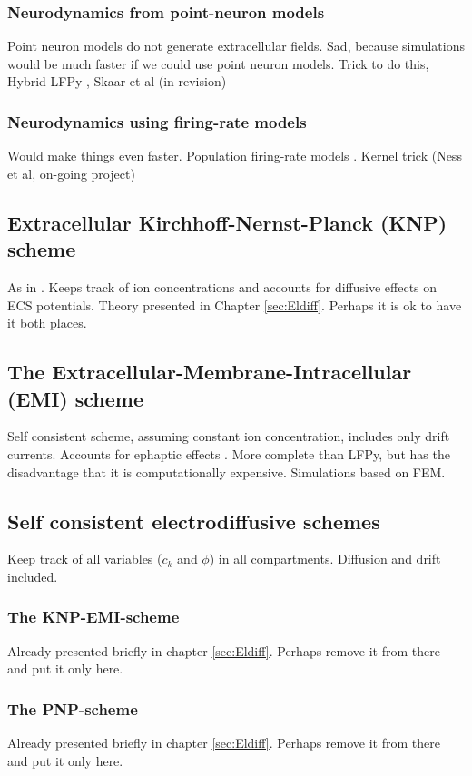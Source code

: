 \subsubsection{Neurodynamics from point-neuron models}
Point neuron models do not generate extracellular fields. Sad, because simulations would be much faster if we could use point neuron models. Trick to do this, Hybrid LFPy \citep{Hagen2016}, Skaar et al (in revision)

\subsubsection{Neurodynamics using firing-rate models}
Would make things even faster. Population firing-rate models  \citep{Hagen2016}. Kernel trick (Ness et al, on-going project) 


\subsection{Extracellular Kirchhoff-Nernst-Planck (KNP) scheme}
As in \cite{Solbra2018}. Keeps track of ion concentrations and accounts for diffusive effects on ECS potentials. Theory presented in Chapter \ref{sec:Eldiff}. Perhaps it is ok to have it both places. 


\subsection{The Extracellular-Membrane-Intracellular (EMI) scheme}
Self consistent scheme, assuming constant ion concentration, includes only drift currents. Accounts for ephaptic effects \cite{Tveito2019}. More complete than LFPy, but has the disadvantage that it is computationally expensive. Simulations based on FEM.


\subsection{Self consistent electrodiffusive schemes}
Keep track of all variables ($c_k$ and $\phi$) in all compartments. Diffusion and drift included. 

\subsubsection{The KNP-EMI-scheme}
Already presented briefly in chapter \ref{sec:Eldiff}. Perhaps remove it from there and put it only here. 

\subsubsection{The PNP-scheme}
Already presented briefly in chapter \ref{sec:Eldiff}. Perhaps remove it from there and put it only here. 

